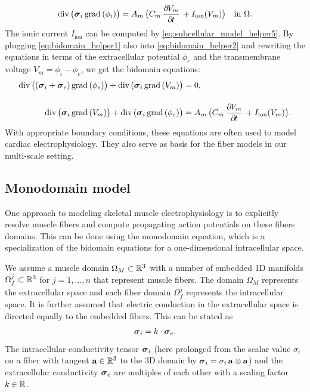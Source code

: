 %
\begin{align*}
  \div\big(\bfsigma_i\,\grad(\phi_i)\big) = A_m\,\big(C_m\,\p{V_m}{t} + I_\text{ion}(V_m)\big) \quad \text{in }\Omega.
\end{align*}
%
The ionic current $I_\text{ion}$ can be computed by \cref{eq:subcellular_model_helper5}. 
By plugging \cref{eq:bidomain_helper1} also into \cref{eq:bidomain_helper2} and rewriting the equations in terms of the extracellular potential $\phi_e$ and the transmembrane voltage $V_m = \phi_i-\phi_e$, we get the bidomain equations:%
\begin{subequations}
  \begin{align}
    \div\big((\bfsigma_i + \bfsigma_e)\,\grad(\phi_e)\big) + \div(\bfsigma_i\,\grad(V_m)\big) &= 0,\label{eq:bidomain1} \\[4mm]
    \div\big(\bfsigma_i\,\grad(V_m)\big) + \div(\bfsigma_i\,\grad(\phi_e)\big) &= A_m\,\big(C_m\,\p{V_m}{t} + I_\text{ion}(V_m)\big).  \label{eq:bidomain2}
  \end{align}
\end{subequations}
%
With appropriate boundary conditions, these equations are often used to model cardiac electrophysiology. They also serve as basis for the fiber models in our multi-scale setting.

\subsection{Monodomain model}\label{sec:monodomain_model}
One approach to modeling skeletal muscle electrophysiology is to explicitly resolve muscle fibers and compute propagating action potentials on these fibers domains.
This can be done using the monodomain equation, which is a specialization of the bidomain equations for a one-dimensional intracellular space.

We assume a muscle domain $\Omega_M \subset \mathbb{R}^3$ with a number of embedded 1D manifolds $\Omega_f^j\subset \mathbb{R}^3$ for $j=1,\dots,n$ that represent muscle fibers. The domain $\Omega_M$ represents the extracellular space and each fiber domain $\Omega_f^j$ represents the intracellular space.
It is further assumed that electric conduction in the extracellular space is directed equally to the embedded fibers. This can be stated as%
\begin{align}\label{eq:monodomain_helper1}
  \boldsymbol{\sigma}_i = k\cdot \boldsymbol{\sigma}_e.  
\end{align}
%
The intracellular conductivity tensor $\boldsymbol{\sigma}_i$ (here prolonged from the scalar value $\sigma_i$ on a fiber with tangent $\textbf{a} \in \mathbb{R}^3$ to the 3D domain by $\boldsymbol{\sigma}_i = \sigma_i \, \textbf{a} \otimes \textbf{a}$) and the extracellular conductivity $\boldsymbol{\sigma}_e$ are multiples of each other with a scaling factor $k\in\mathbb{R}$.

